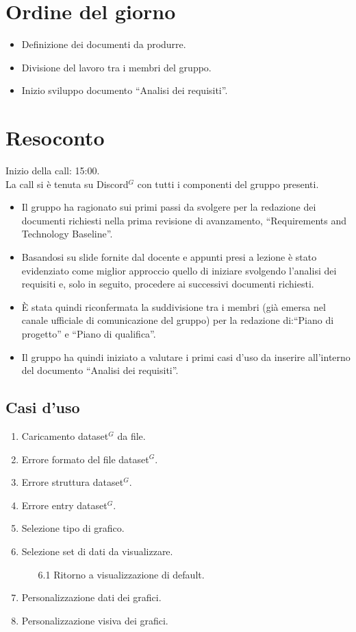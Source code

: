 \section{Ordine del giorno}

\begin{itemize}
	\item Definizione dei documenti da produrre.
	\item Divisione del lavoro tra i membri del gruppo.
	\item Inizio sviluppo documento ``Analisi dei requisiti''.
\end{itemize}

\section{Resoconto}

\noindent 
Inizio della call: 15:00. \\
\noindent La call si è tenuta su Discord$^{G}$ con tutti i componenti del gruppo presenti.
\begin{itemize}
	\item Il gruppo ha ragionato sui primi passi da svolgere per la redazione dei documenti richiesti nella prima revisione di avanzamento, ``Requirements and Technology Baseline''.
	\item Basandosi su slide fornite dal docente e appunti presi a lezione è stato evidenziato come miglior approccio quello di iniziare svolgendo l'analisi dei requisiti e, solo in seguito, procedere ai successivi documenti richiesti.
	\item È stata quindi riconfermata la suddivisione tra i membri (già emersa nel canale ufficiale di comunicazione del gruppo) per la redazione di:``Piano di progetto'' e ``Piano di qualifica''.
	\item Il gruppo ha quindi iniziato a valutare i primi casi d'uso da inserire all'interno del documento ``Analisi dei requisiti''.
\end{itemize}

\subsection{Casi d'uso}
\begin{enumerate}
	\item Caricamento dataset$^{G}$ da file.
	\item Errore formato del file dataset$^{G}$.
	\item Errore struttura dataset$^{G}$.
	\item Errore entry dataset$^{G}$.
	\item Selezione tipo di grafico.
	\item Selezione set di dati da visualizzare.
	\begin{enumerate}
		\item[6.1] Ritorno a visualizzazione di default.
	\end{enumerate}
	\item Personalizzazione dati dei grafici.
	\item Personalizzazione visiva dei grafici.
\end{enumerate} 

